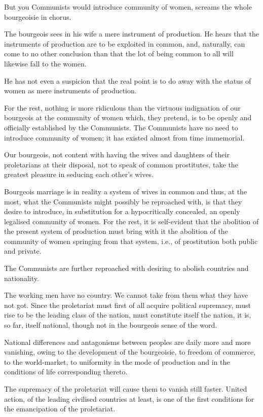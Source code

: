 \documentclass[11pt]{book}
\begin{document}
But you Communists would introduce community of women, screams
the whole bourgeoisie in chorus.

The bourgeois sees in his wife a mere instrument of production.
He hears that the instruments of production are to be exploited
in common, and, naturally, can come to no other conclusion than
that the lot of being common to all will likewise fall to the
women.

He has not even a suspicion that the real point is to do away
with the status of women as mere instruments of production.

For the rest, nothing is more ridiculous than the
virtuous indignation of our bourgeois at the community of women
which, they pretend, is to be openly and officially established
by the Communists.  The Communists have no need to introduce
community of women; it has existed almost from time immemorial.

Our bourgeois, not content with having the wives and daughters
of their proletarians at their disposal, not to speak of common
prostitutes, take the greatest pleasure in seducing each other's
wives.

Bourgeois marriage is in reality a system of wives in common
and thus, at the most, what the Communists might possibly
be reproached with, is that they desire to introduce, in
substitution for a hypocritically concealed, an openly legalised
community of women. For the rest, it is self-evident that the
abolition of the present system of production must bring with it
the abolition of the community of women springing from that
system, i.e., of prostitution both public and private.

The Communists are further reproached with desiring to abolish
countries and nationality.

The working men have no country.  We cannot take from them what
they have not got.  Since the proletariat must first of all
acquire political supremacy, must rise to be the leading class of
the nation, must constitute itself the nation, it is, so far,
itself national, though not in the bourgeois sense of the word.

National differences and antagonisms between peoples are daily
more and more vanishing, owing to the development of the
bourgeoisie, to freedom of commerce, to the world-market, to
uniformity in the mode of production and in the conditions of
life corresponding thereto.

The supremacy of the proletariat will cause them to vanish still
faster. United action, of the leading civilised countries at
least, is one of the first conditions for the emancipation of
the proletariat.
\end{document}
